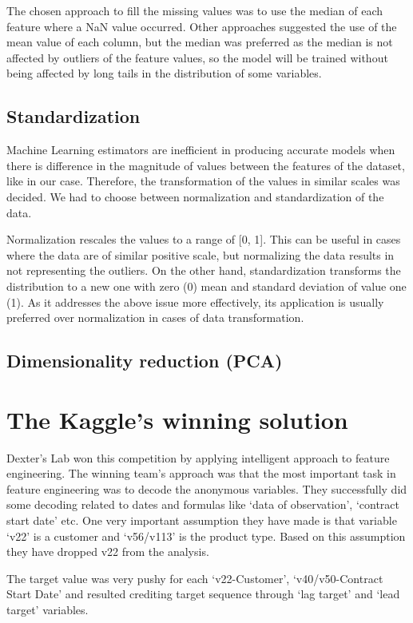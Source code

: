 \documentclass[conference, onecolumn]{IEEEtran}
\begin{document}
The chosen approach to fill the missing values was to use the median of each feature where a NaN value occurred. Other approaches suggested the use of the mean value of each column, but the median was preferred as the median is not affected by outliers of the feature values, so the model will be trained without being affected by long tails in the distribution of some variables.

\subsection{Standardization}
Machine Learning estimators are inefficient in producing accurate models when there is difference in the magnitude of values between the features of the dataset, like in our case. Therefore, the transformation of the values in similar scales was decided. We had to choose between normalization and standardization of the data.

Normalization rescales the values to a range of [0, 1]. This can be useful in cases where the data are of similar positive scale, but normalizing the data results in not representing the outliers. On the other hand, standardization transforms the distribution to a new one with zero (0) mean and standard deviation of value one (1). As it addresses the above issue more effectively, its application is usually preferred over normalization in cases of data transformation.

\subsection{Dimensionality reduction (PCA)}


\section{The Kaggle's winning solution}
Dexter’s Lab won this competition by applying intelligent approach to feature engineering.  The winning team's approach was that the most important task in feature engineering was to decode the anonymous variables. They successfully did some decoding related to dates and formulas like ‘data of observation’, ‘contract start date’ etc. One very important assumption they have made is that variable ‘v22’ is a customer and ‘v56/v113’ is the product type. Based on this assumption they have dropped v22 from the analysis.

The target value was very pushy for each ‘v22-Customer’, ‘v40/v50-Contract Start Date’ and resulted crediting target sequence through ‘lag target’ and ‘lead target’ variables. 
\end{document}
